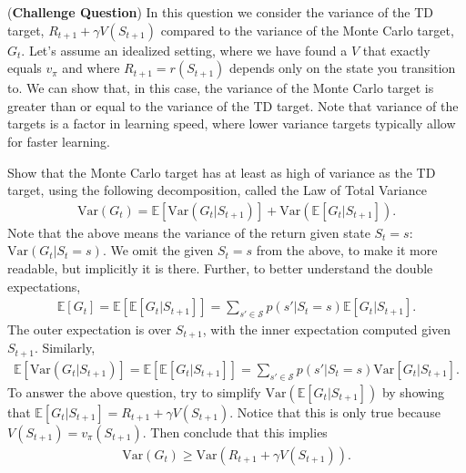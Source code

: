 (\textbf{Challenge Question})
In this question we consider the variance of the TD target, $R_{t+1} + \gamma V(S_{t+1})$ compared to the variance of the Monte Carlo target, $G_t$. Let's assume an idealized setting, where we have found a $V$ that exactly equals $v_\pi$ and where $R_{t+1} = r(S_{t+1})$ depends only on the state you transition to. We can show that, in this case, the variance of the Monte Carlo target is greater than or equal to the variance of the TD target. Note that variance of the targets is a factor in learning speed, where lower variance targets typically allow for faster learning. 

Show that  the Monte Carlo target has at least as high of variance as the TD target, using the following decomposition, called the Law of Total Variance
%
\begin{align*}
\text{Var}(G_t) = \mathbb{E}[\text{Var}(G_t | S_{t+1})] + \text{Var}(\mathbb{E}[G_t | S_{t+1}])  
.
\end{align*} 
%
Note that the above means the variance of the return given state $S_t = s$: $\text{Var}(G_t | S_t = s)$. We omit the given $S_t = s$ from the above, to make it more readable, but implicitly it is there. Further, to better understand the double expectations, 
%
\begin{align*}
\mathbb{E}[G_t] = \mathbb{E}[\mathbb{E}[G_t | S_{t+1}]] = \sum _{s' \in \mathcal{S}} p(s' | S_t = s) \mathbb{E}[G_t | S_{t+1}]
.
\end{align*} 
%
The outer expectation is over $S_{t+1}$, with the inner expectation computed given $S_{t+1}$. Similarly, 
%
\begin{align*}
\mathbb{E}[\text{Var}(G_t | S_{t+1})]  = \mathbb{E}[\mathbb{E}[G_t | S_{t+1}]] = \sum _{s' \in \mathcal{S}} p(s' | S_t = s) \text{Var}[G_t | S_{t+1}]
.
\end{align*} 
% 
To answer the above question, try to simplify $\text{Var}(\mathbb{E}[G_t | S_{t+1}])$ by showing that $\mathbb{E}[G_t | S_{t+1}] = R_{t+1} + \gamma V(S_{t+1})$. Notice that this is only true because $V(S_{t+1}) = v_\pi(S_{t+1})$.
Then conclude that this implies  
%
\begin{align*}
\text{Var}(G_t) \ge \text{Var}(R_{t+1} + \gamma V(S_{t+1}))  
.
\end{align*} 
%
